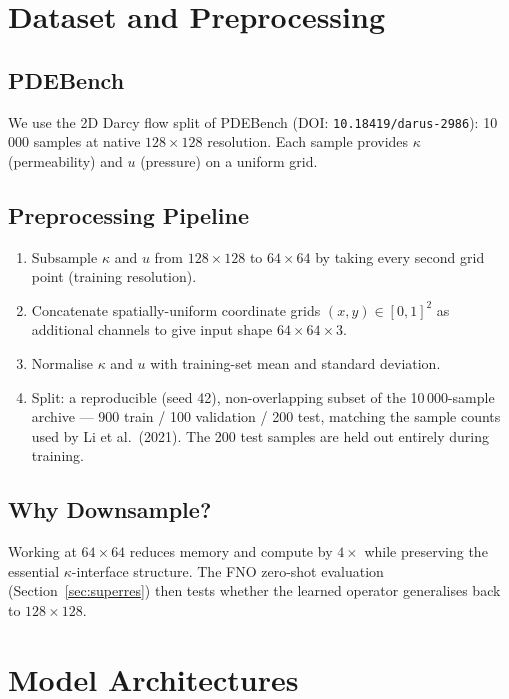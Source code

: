 \documentclass[11pt,a4paper]{article}
\begin{document}
\section{Dataset and Preprocessing}

\subsection{PDEBench}
We use the 2D Darcy flow split of PDEBench \cite{takamoto2022pdebench} (DOI: \texttt{10.18419/darus-2986}): 10\,000 samples at native $128\times128$ resolution. Each sample provides $\kappa$ (permeability) and $u$ (pressure) on a uniform grid.

\subsection{Preprocessing Pipeline}
\begin{enumerate}[nosep]
  \item Subsample $\kappa$ and $u$ from $128\times128$ to $64\times64$ by taking every second grid point (training resolution).
  \item Concatenate spatially-uniform coordinate grids $(x,y)\in[0,1]^2$ as additional channels to give input shape $64\times64\times3$.
  \item Normalise $\kappa$ and $u$ with training-set mean and standard deviation.
  \item Split: a reproducible (seed 42), non-overlapping subset of the 10\,000-sample archive --- 900 train / 100 validation / 200 test, matching the sample counts used by Li et al.\ (2021). The 200 test samples are held out entirely during training.
\end{enumerate}

\subsection{Why Downsample?}
Working at $64\times64$ reduces memory and compute by $4\times$ while preserving the essential $\kappa$-interface structure. The FNO zero-shot evaluation (Section~\ref{sec:superres}) then tests whether the learned operator generalises back to $128\times128$.

\section{Model Architectures}
\end{document}
